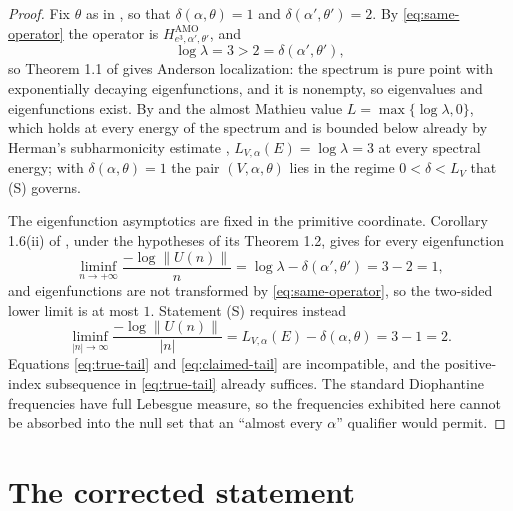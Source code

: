 \documentclass[11pt,reqno]{amsart}
\theoremstyle{plain}
\theoremstyle{definition}
\theoremstyle{remark}
\numberwithin{equation}{section}
\begin{document}
\begin{proof}
  Fix $\theta$ as in , so that
  $\delta(\alpha,\theta)=1$ and $\delta(\alpha',\theta')=2$. By
  \eqref{eq:same-operator} the operator is
  $H^{\mathrm{AMO}}_{e^{3},\alpha',\theta'}$, and
  \begin{equation}
    \label{eq:loc}
    \log\lambda=3>2=\delta(\alpha',\theta'),
  \end{equation}
  so Theorem 1.1 of \cite{Jitomirskaya_2024ur} gives Anderson localization:
  the spectrum is pure point with exponentially decaying eigenfunctions, and
  it is nonempty, so eigenvalues and eigenfunctions exist. By
   and the almost Mathieu value
  $L=\max\{\log\lambda,0\}$, which holds at every energy of the spectrum
  \cite{Bourgain_2002co,Damanik_2016so} and is bounded below already by
  Herman's subharmonicity estimate \cite{Herman_1983um},
  $L_{V,\alpha}(E)=\log\lambda=3$ at every spectral energy; with
  $\delta(\alpha,\theta)=1$ the pair $(V,\alpha,\theta)$
  lies in the regime $0<\delta<L_V$ that (S) governs.

  The eigenfunction asymptotics are fixed in the primitive coordinate.
  Corollary 1.6(ii) of \cite{Jitomirskaya_2024ur}, under the hypotheses of its
  Theorem 1.2, gives for every eigenfunction
  \begin{equation}
    \label{eq:true-tail}
    \liminf_{n\to+\infty}\frac{-\log\lVert U(n)\rVert}{n}
    =\log\lambda-\delta(\alpha',\theta')=3-2=1,
  \end{equation}
  and eigenfunctions are not transformed by \eqref{eq:same-operator}, so the
  two-sided lower limit is at most $1$. Statement (S) requires instead
  \begin{equation}
    \label{eq:claimed-tail}
    \liminf_{|n|\to\infty}\frac{-\log\lVert U(n)\rVert}{|n|}
    =L_{V,\alpha}(E)-\delta(\alpha,\theta)=3-1=2 .
  \end{equation}
  Equations \eqref{eq:true-tail} and \eqref{eq:claimed-tail} are
  incompatible, and the positive-index subsequence in \eqref{eq:true-tail}
  already suffices. The standard Diophantine frequencies have full Lebesgue
  measure, so the frequencies exhibited here cannot be absorbed into the null
  set that an ``almost every $\alpha$'' qualifier would permit.
\end{proof}

\section{The corrected statement}
\label{sec:corrected}
\end{document}
